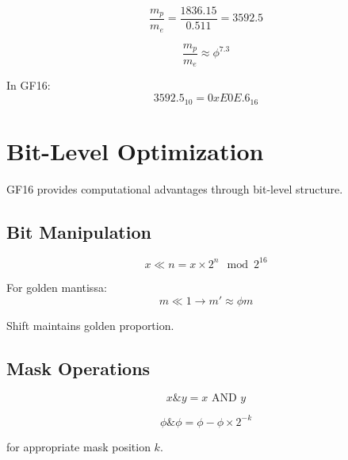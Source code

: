 \begin{equation}
\frac{m_p}{m_e} = \frac{1836.15}{0.511} = 3592.5
\end{equation}

\begin{theorem}
\label{thm:golden-mass}
\begin{equation}
\frac{m_p}{m_e} \approx \phi^{7.3}
\end{equation}

In GF16:
\begin{equation}
3592.5_10 = 0xE0E.6_16
\end{equation}
\end{theorem}

\section{Bit-Level Optimization}

GF16 provides computational advantages through bit-level structure.

\subsection{Bit Manipulation}

\begin{definition}
\label{def:bit-shift}
\begin{equation}
x \ll n = x \times 2^n \mod 2^{16}
\end{equation}
\end{definition}

\begin{proposition}
\label{prop:golden-shift}
For golden mantissa:
\begin{equation}
m \ll 1 \to m' \approx \phi m
\end{equation}

Shift maintains golden proportion.
\end{proposition}

\subsection{Mask Operations}

\begin{equation}
x \& y = x \text{ AND } y
\end{equation}

\begin{theorem}
\label{thm:golden-mask}
\begin{equation}
\phi \& \phi = \phi - \phi \times 2^{-k}
\end{equation}

for appropriate mask position $k$.
\end{theorem}

